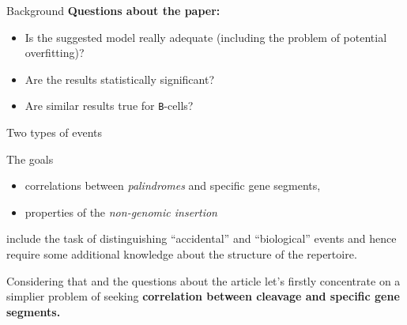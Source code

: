 \documentclass{beamer}\usepackage[]{graphicx}\usepackage[]{color}
\begin{document}
\begin{frame}{Background}
  \textbf{Questions about the paper:}
  \begin{itemize}
    \item Is the suggested model really adequate (including the problem of potential overfitting)?
    \item Are the results statistically significant?
    \item Are similar results true for \texttt{B}-cells?
  \end{itemize}
% 
\end{frame}

\begin{frame}{Two types of events}
  

  The goals 
  \begin{itemize}
    \item correlations between \textit{palindromes} and specific gene segments,
    \item properties of the \textit{non-genomic insertion}
  \end{itemize}
  include the task of distinguishing {\color{blue}``accidental''} and {\color{blue}``biological''} events and hence require some additional knowledge about the structure of the repertoire.
 
  \bigskip
  Considering that and the questions about the article let's firstly concentrate on a simplier problem of seeking \textbf{correlation between cleavage and specific gene segments.} 
\end{frame}
\end{document}
